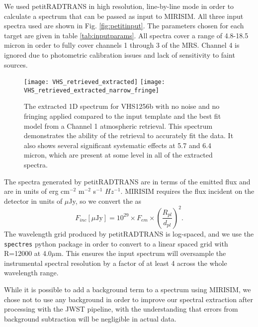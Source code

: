 We used petitRADTRANS in high resolution, line-by-line mode in order to calculate a spectrum that can be passed as input to MIRISIM.
All three input spectra used are shown in Fig. \ref{fig:petitinput}.
The parameters chosen for each target are given in table \ref{tab:inputparams}. 
All spectra cover a range of 4.8-18.5 micron in order to fully cover channels 1 through 3 of the MRS. 
Channel 4 is ignored due to photometric calibration issues and lack of sensitivity to faint sources.

\begin{figure}[t]
	\texttt{[image: VHS\_retrieved\_extracted]}
	\texttt{[image: VHS\_retrieved\_extracted\_narrow\_fringe]}
	\caption{The extracted 1D spectrum for VHS1256b with no noise and no fringing applied compared to the input template and the best fit model from a Channel 1 atmospheric retrieval. This spectrum demonstrates the ability of the retrieval to accurately fit the data. It also shows several significant systematic effects at 5.7 and 6.4 micron, which are present at some level in all of the extracted spectra.}
	\label{fig:vhsnofringeextractedbestfit}
\end{figure}
The spectra generated by petitRADTRANS are in terms of the emitted flux and are in units of erg cm$^{-2}$ m$^{-2}$ s$^{-1}$ $Hz^{-1}$. 
MIRISIM requires the flux incident on the detector in units of $\mu$Jy, so we convert the as 
\begin{equation}
F_{inc} [\mu\textrm{Jy}] = 10^{29}\times F_{em} \times \left(\frac{R_{pl}}{d_{pl}}\right)^{2}.
\end{equation}
The wavelength grid produced by petitRADTRANS is log-spaced, and we use the \verb|spectres| python package \parencite{Carnall2017} in order to convert to a linear spaced grid with R=12000 at 4.0$\mu$m. 
This ensures the input spectrum will oversample the instrumental spectral resolution by a factor of at least 4 across the whole wavelength range.

While it is possible to add a background term to a spectrum using MIRISIM, we chose not to use any background in order to improve our spectral extraction after processing with the JWST pipeline, with the understanding that errors from background subtraction will be negligible in actual data.


